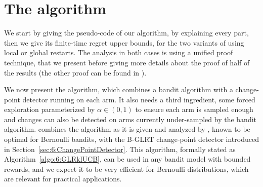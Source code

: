 \section{The \GLRklUCB{} algorithm}
\label{sec:6:GLRklUCB_Algorithm}

We start by giving the pseudo-code of our algorithm, by explaining every part, then we give its finite-time regret upper bounds, for the two variants of using local or global restarts.
The analysis in both cases is using a unified proof technique, that we present before giving more details about the proof of half of the results (the other proof can be found in \cite{Besson2019GLRT}).



We now present the \GLRklUCB{} algorithm, which combines a bandit algorithm with a change-point detector running on each arm.
It also needs a third ingredient, some forced exploration parameterized by $\alpha\in(0,1)$ to ensure each arm is sampled enough and changes can also be detected on arms currently under-sampled by the bandit algorithm.
%
\GLRklUCB{} combines the \klUCB{} algorithm as it is given and analyzed by \cite{KLUCBJournal}, known to be optimal for Bernoulli bandits, with the B-GLRT change-point detector introduced in Section~\ref{sec:6:ChangePointDetector}.
%
This algorithm, formally stated as Algorithm~\ref{algo:6:GLRklUCB}, can be used in any bandit model with bounded rewards, and we expect it to be very efficient for Bernoulli distributions, which are relevant for practical applications.

